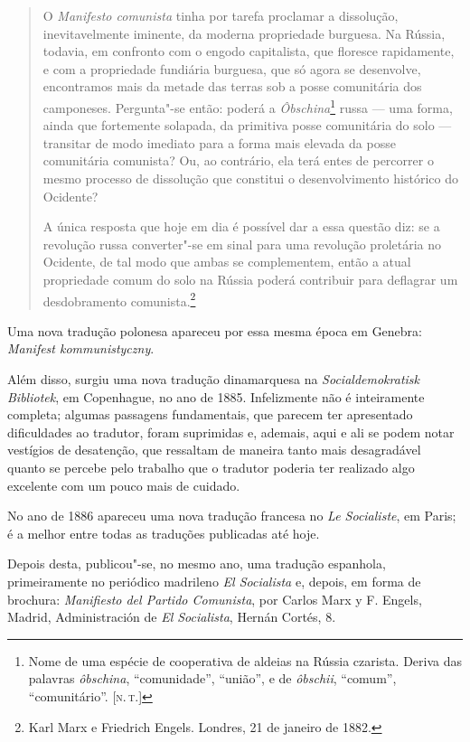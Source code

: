 \begin{quote}
 O \textit{Manifesto comunista} tinha por tarefa proclamar a dissolução,
inevitavelmente iminente, da moderna propriedade burguesa. Na Rússia,
todavia, em confronto com o engodo capitalista, que floresce rapidamente,
e com a propriedade fundiária burguesa, que só agora se desenvolve,
encontramos mais da metade das terras sob a posse comunitária dos
camponeses. Pergunta"-se então: poderá a
\textit{Ôbschina}\footnote{Nome de uma espécie de cooperativa de aldeias na Rússia czarista. Deriva das
palavras \textit{ôbschina}, ``comunidade'', ``união'', e de \textit{ôbschii}, ``comum'', ``comunitário''. [\textsc{n.\,t.}]} russa
--- uma forma, ainda que fortemente solapada, da primitiva posse
comunitária do solo --- transitar de modo imediato para a forma mais
elevada da posse comunitária comunista? Ou, ao contrário, ela terá
entes de percorrer o mesmo processo de dissolução que constitui o
desenvolvimento histórico do Ocidente?

 A única resposta que hoje em dia é possível dar a essa questão diz: se
a revolução russa converter"-se em sinal para uma revolução proletária
no Ocidente, de tal modo que ambas se complementem, então a atual
propriedade comum do solo na Rússia poderá contribuir para deflagrar um
desdobramento comunista.\footnote{Karl Marx e Friedrich Engels. Londres, 21 de janeiro de 1882.}
\end{quote} 

 Uma nova tradução polonesa apareceu por essa mesma época em Genebra:
\textit{Manifest kommunistyczny}.

 Além disso, surgiu uma nova tradução dinamarquesa na
\textit{Socialdemokratisk Bibliotek}, em Copenhague, no ano de 1885.
Infelizmente não é inteiramente completa; algumas passagens
fundamentais, que parecem ter apresentado dificuldades ao tradutor,
foram suprimidas e, ademais, aqui e ali se podem notar vestígios de
desatenção, que ressaltam de maneira tanto mais desagradável quanto se
percebe pelo trabalho que o tradutor poderia ter realizado algo
excelente com um pouco mais de cuidado.

 No ano de 1886 apareceu uma nova tradução francesa no \textit{Le
Socialiste}, em Paris; é a melhor entre todas as traduções publicadas
até hoje.

 Depois desta, publicou"-se, no mesmo ano, uma tradução espanhola,
primeiramente no periódico madrileno \textit{El Socialista} e, depois,
em forma de brochura: \textit{Manifiesto del Partido Comunista}, por
Carlos Marx y F. Engels, Madrid, Administración de \textit{El Socialista},
Hernán Cortés, 8.

